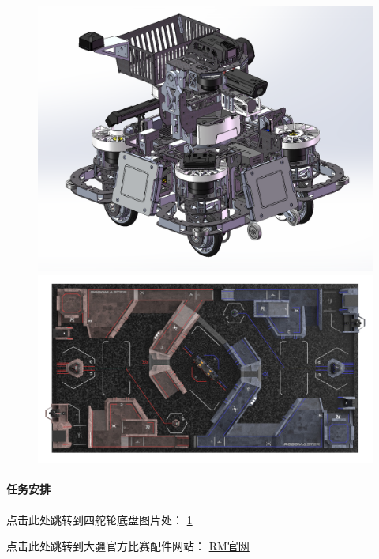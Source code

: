         \begin{figure}[H]
            \centering
            \includegraphics[height=0.35\textwidth]{figure/2_test1.png}
            \hspace{0.5em}
            \includegraphics[height=0.35\textwidth]{figure/2_test2.png}
            \label{fig:test}
        \end{figure}

    \paragraph{任务安排}
    
        点击此处跳转到四舵轮底盘图片处：
        \ref{fig:test}
        
        点击此处跳转到大疆官方比赛配件网站：
        \href{https://www.robomaster.com/}{RM官网}

        \noindent
        
